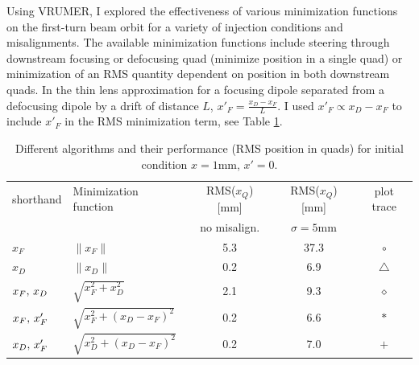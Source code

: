 Using VRUMER, I explored the effectiveness of various minimization functions on the first-turn beam orbit for a variety of injection conditions and misalignments. The available minimization functions include steering through downstream focusing or defocusing quad (minimize position in a single quad) or minimization of an RMS quantity dependent on position in both downstream quads. In the thin lens approximation for a focusing dipole separated from a defocusing dipole by a drift of distance $L$, $x'_F = \frac{x_D-x_F}{L}$. I used $x'_F \propto x_D-x_F$ to include $x'_F$ in the RMS minimization term, see Table \ref{tab:algorithm}.

\begin{table}[h]
\centering
\caption{Different algorithms and their performance (RMS position in quads) for initial condition $x=1$mm, $x'=0$. }
\label{tab:algorithm}
\begin{tabular}{|l|l|c|c|c|}
\hline
shorthand & Minimization function & RMS($x_Q$) [mm] & RMS($x_Q$) [mm]  & plot trace \\
& & no misalign. & $\sigma=5$mm & \\
\hline
$x_F$ & $\| x_F \|$ & 5.3 & 37.3 & {\color{blue} $\circ$} \\
$x_D$ & $\| x_D \|$ & 0.2 & 6.9 & {\color{red} $\triangle$} \\
$x_F,\thinspace x_D$ & $\sqrt{x_F^2+x_D^2}$ &  2.1 & 9.3 & {\color{cyan} $\diamond$} \\
$x_F,\thinspace x'_F$ & $\sqrt{x_F^2+(x_D-x_F)^2}$ & 0.2 & 6.6 & $\ast$ \\
$x_D,\thinspace x'_F$ & $\sqrt{x_D^2+(x_D-x_F)^2}$  & 0.2 & 7.0 & {\color{magenta} $+$} \\
\hline
\end{tabular}
\end{table}





